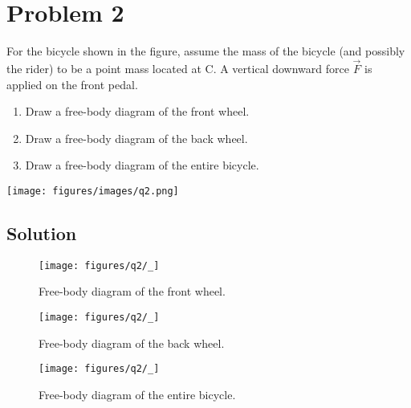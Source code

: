 \section*{Problem 2}

For the bicycle shown in the figure, assume the mass of the bicycle (and possibly the rider) to be a point mass located at C.
A vertical downward force \( \vec{F} \) is applied on the front pedal.

\begin{enumerate}[label = (\alph*)]
    \item Draw a free-body diagram of the front wheel.
    \item Draw a free-body diagram of the back wheel.
    \item Draw a free-body diagram of the entire bicycle.
\end{enumerate}

\begin{figure*}[h]
    \centering
    \texttt{[image: figures/images/q2.png]}
\end{figure*}

\subsection*{Solution}

\begin{figure}[htbp]
    \centering
    \texttt{[image: figures/q2/\_]}
    \caption{
        Free-body diagram of the front wheel.
    }
\end{figure}

\begin{figure}[htbp]
    \centering
    \texttt{[image: figures/q2/\_]}
    \caption{
        Free-body diagram of the back wheel.
    }
\end{figure}

\begin{figure}[htbp]
    \centering
    \texttt{[image: figures/q2/\_]}
    \caption{
        Free-body diagram of the entire bicycle.
    }
\end{figure}
